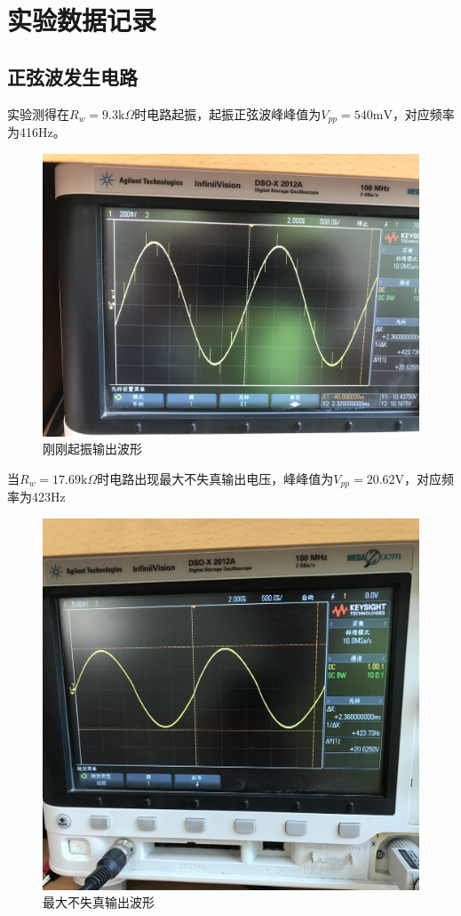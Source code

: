\documentclass[UTF8,a4paper]{paper}
\begin{document}
\section{实验数据记录}
\begin{multicols}{2}
\subsection{正弦波发生电路}
实验测得在$R_w=9.3\mathrm{k}\Omega$时电路起振，起振正弦波峰峰值为$V_{pp}=540\mathrm{mV}$，对应频率为416Hz。
\begin{figure}[H]
\centering
\includegraphics[width=\columnwidth,angle=0]{wave/IMG_0635.jpg}
\caption{刚刚起振输出波形}
\label{1}
\end{figure}
\end{multicols}
\begin{multicols}{2}
当$R_w=17.69\mathrm{k}\Omega$时电路出现最大不失真输出电压，峰峰值为$V_{pp}=20.62\mathrm{V}$，对应频率为423Hz
\begin{figure}[H]
\centering
\includegraphics[width=\columnwidth,angle=0]{wave/IMG_0636.jpg}
\caption{最大不失真输出波形}
\label{2}
\end{figure}
\end{multicols}
\end{document}
